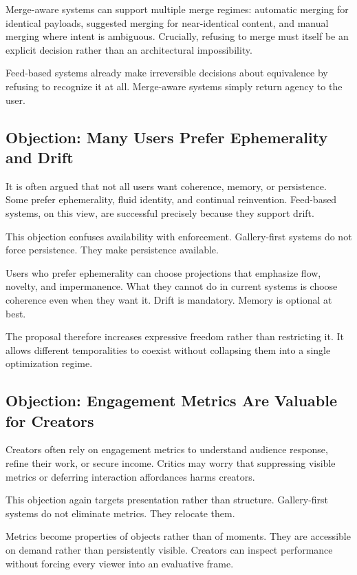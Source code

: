 \documentclass[11pt,oneside]{article}
\begin{document}
Merge-aware systems can support multiple merge regimes: automatic merging for identical payloads, suggested merging for near-identical content, and manual merging where intent is ambiguous. Crucially, refusing to merge must itself be an explicit decision rather than an architectural impossibility.

Feed-based systems already make irreversible decisions about equivalence by refusing to recognize it at all. Merge-aware systems simply return agency to the user.

\subsection{Objection: Many Users Prefer Ephemerality and Drift}

It is often argued that not all users want coherence, memory, or persistence. Some prefer ephemerality, fluid identity, and continual reinvention. Feed-based systems, on this view, are successful precisely because they support drift.

This objection confuses availability with enforcement. Gallery-first systems do not force persistence. They make persistence available.

Users who prefer ephemerality can choose projections that emphasize flow, novelty, and impermanence. What they cannot do in current systems is choose coherence even when they want it. Drift is mandatory. Memory is optional at best.

The proposal therefore increases expressive freedom rather than restricting it. It allows different temporalities to coexist without collapsing them into a single optimization regime.

\subsection{Objection: Engagement Metrics Are Valuable for Creators}

Creators often rely on engagement metrics to understand audience response, refine their work, or secure income. Critics may worry that suppressing visible metrics or deferring interaction affordances harms creators.

This objection again targets presentation rather than structure. Gallery-first systems do not eliminate metrics. They relocate them.

Metrics become properties of objects rather than of moments. They are accessible on demand rather than persistently visible. Creators can inspect performance without forcing every viewer into an evaluative frame.
\end{document}
